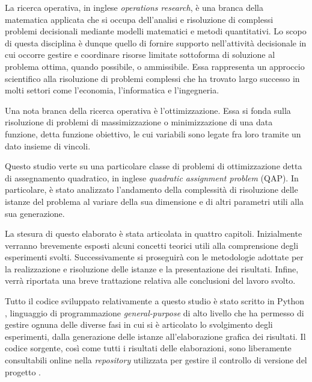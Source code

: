 La ricerca operativa, in inglese \textit{operations research}, è una branca della matematica applicata 
che si occupa dell'analisi e risoluzione di complessi problemi decisionali mediante modelli matematici e 
metodi quantitativi. Lo scopo di questa disciplina è dunque quello di fornire supporto nell'attività 
decisionale in cui occorre gestire e coordinare risorse limitate sottoforma di soluzione al problema ottima, 
quando possibile, o ammissibile. Essa rappresenta un approccio scientifico alla risoluzione di problemi 
complessi che ha trovato largo successo in molti settori come l'economia, l'informatica e l'ingegneria.

Una nota branca della ricerca operativa è l'ottimizzazione. Essa si fonda sulla risoluzione di problemi di 
massimizzazione o minimizzazione di una data funzione, detta funzione obiettivo, le cui variabili sono legate 
fra loro tramite un dato insieme di vincoli.

Questo studio verte su una particolare classe di problemi di ottimizzazione detta di assegnamento quadratico,
in inglese \textit{quadratic assignment problem} (QAP). In particolare, è stato analizzato l'andamento della
complessità di risoluzione delle istanze del problema al variare della sua dimensione e di altri parametri 
utili alla sua generazione.

La stesura di questo elaborato è stata articolata in quattro capitoli. Inizialmente verranno brevemente esposti
alcuni concetti teorici utili alla comprensione degli esperimenti svolti. Successivamente si proseguirà con le
metodologie adottate per la realizzazione e risoluzione delle istanze e la presentazione dei risultati. Infine,
verrà riportata una breve trattazione relativa alle conclusioni del lavoro svolto.

Tutto il codice sviluppato relativamente a questo studio è stato scritto in Python \cite{python}, linguaggio di 
programmazione \textit{general-purpose} di alto livello che ha permesso di gestire ognuna delle diverse fasi in 
cui si è articolato lo svolgimento degli esperimenti, dalla generazione delle istanze all'elaborazione grafica dei 
risultati. Il codice sorgente, così come tutti i risultati delle elaborazioni, sono liberamente consultabili 
online nella \textit{repository} utilizzata per gestire il controllo di versione del progetto \cite{repository}.